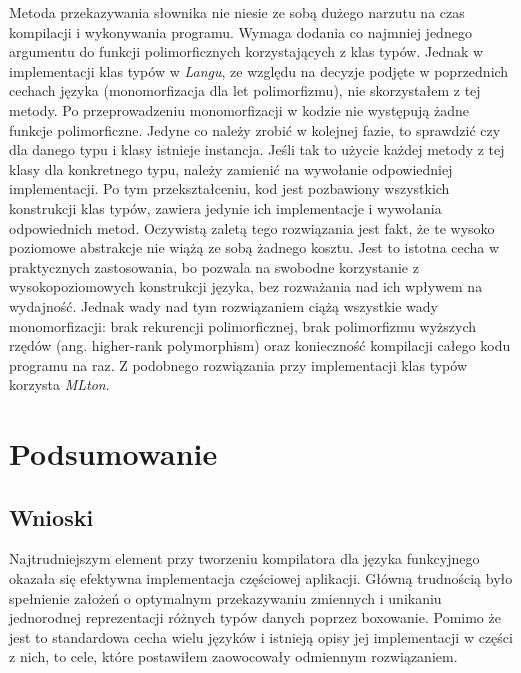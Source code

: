 \documentclass[declaration,shortabstract]{iithesis}
\begin{document}

Metoda przekazywania słownika nie niesie ze sobą dużego narzutu na czas 
kompilacji i wykonywania programu. Wymaga dodania co najmniej
jednego argumentu do funkcji polimorficznych korzystających z klas typów. 
Jednak w implementacji klas typów w \textit{Langu}, ze względu na decyzje 
podjęte w poprzednich cechach języka (monomorfizacja dla let polimorfizmu), 
nie skorzystałem z tej metody. Po przeprowadzeniu monomorfizacji w kodzie nie 
występują żadne funkcje polimorficzne. Jedyne co należy zrobić w kolejnej 
fazie, to sprawdzić czy dla danego typu i klasy istnieje instancja. Jeśli tak 
to użycie każdej metody z tej klasy dla konkretnego typu, należy zamienić 
na wywołanie odpowiedniej implementacji. Po tym przekształceniu, kod jest 
pozbawiony wszystkich konstrukcji klas typów, zawiera jedynie ich 
implementacje i wywołania odpowiednich metod. Oczywistą zaletą tego rozwiązania
jest fakt, że te wysoko poziomowe abstrakcje nie wiążą ze sobą żadnego kosztu.
Jest to istotna cecha w praktycznych zastosowania, bo pozwala na swobodne 
korzystanie z wysokopoziomowych konstrukcji języka, bez rozważania nad ich 
wpływem na wydajność. Jednak wady nad tym rozwiązaniem ciążą wszystkie wady 
monomorfizacji: brak rekurencji polimorficznej, brak polimorfizmu wyższych 
rzędów (ang. higher-rank polymorphism) oraz konieczność kompilacji całego kodu 
programu na raz. Z podobnego rozwiązania przy implementacji klas typów 
korzysta \textit{MLton}.



\chapter{Podsumowanie}

\section{Wnioski}
Najtrudniejszym element przy tworzeniu kompilatora dla języka funkcyjnego 
okazała się efektywna implementacja częściowej aplikacji. Główną trudnością
było spełnienie założeń o optymalnym przekazywaniu zmiennych i unikaniu 
jednorodnej reprezentacji różnych typów danych poprzez boxowanie. Pomimo że 
jest to standardowa cecha wielu języków i istnieją opisy jej implementacji
w części z nich, to cele, które postawiłem zaowocowały odmiennym rozwiązaniem.
\end{document}
